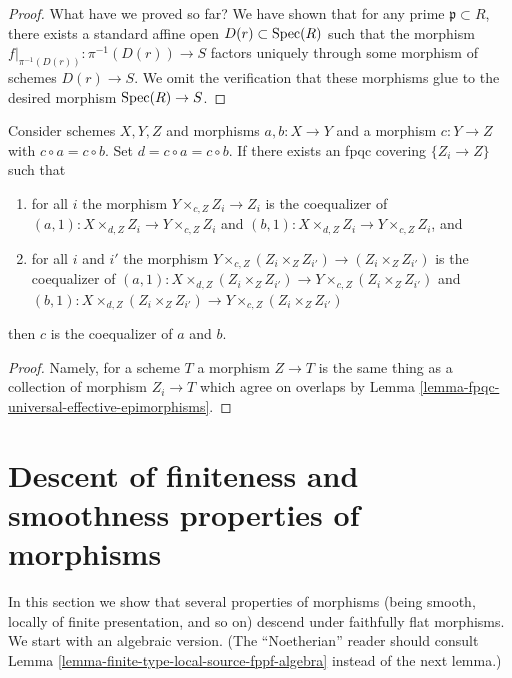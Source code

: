 \begin{proof}
\medskip\noindent
What have we proved so far? We have shown that for any prime
$\mathfrak p \subset R$, there exists a standard affine open
$D(r) \subset \mathop{\mathrm{Spec}}(R)$ such that the morphism
$f|_{\pi^{-1}(D(r))} : \pi^{-1}(D(r)) \to S$ factors uniquely
through some morphism of schemes $D(r) \to S$. We omit the
verification that these morphisms glue to the desired
morphism $\mathop{\mathrm{Spec}}(R) \to S$.
\end{proof}

\begin{lemma}
\label{lemma-coequalizer-fpqc-local}
Consider schemes $X, Y, Z$ and morphisms $a, b : X \to Y$ and
a morphism $c : Y \to Z$ with $c \circ a = c \circ b$. Set
$d = c \circ a = c \circ b$. If there exists an
fpqc covering $\{Z_i \to Z\}$ such that
\begin{enumerate}
\item for all $i$ the morphism $Y \times_{c, Z} Z_i \to Z_i$
is the coequalizer of $(a, 1) : X \times_{d, Z} Z_i \to Y \times_{c, Z} Z_i$
and $(b, 1) : X \times_{d, Z} Z_i \to Y \times_{c, Z} Z_i$, and
\item for all $i$ and $i'$ the morphism
$Y \times_{c, Z} (Z_i \times_Z Z_{i'}) \to (Z_i \times_Z Z_{i'})$
is the coequalizer of
$(a, 1) : X \times_{d, Z} (Z_i \times_Z Z_{i'}) \to
Y \times_{c, Z} (Z_i \times_Z Z_{i'})$ and
$(b, 1) : X \times_{d, Z} (Z_i \times_Z Z_{i'}) \to
Y \times_{c, Z} (Z_i \times_Z Z_{i'})$
\end{enumerate}
then $c$ is the coequalizer of $a$ and $b$.
\end{lemma}

\begin{proof}
Namely, for a scheme $T$ a morphism $Z \to T$ is the same thing as
a collection of morphism $Z_i \to T$ which agree on overlaps by
Lemma \ref{lemma-fpqc-universal-effective-epimorphisms}.
\end{proof}















\section{Descent of finiteness and smoothness properties of morphisms}
\label{section-descent-finiteness-morphisms}

\noindent
In this section we show that several properties
of morphisms (being smooth, locally of finite presentation,
and so on) descend under faithfully flat morphisms. We start
with an algebraic version. (The ``Noetherian'' reader should
consult Lemma \ref{lemma-finite-type-local-source-fppf-algebra}
instead of the next lemma.)

